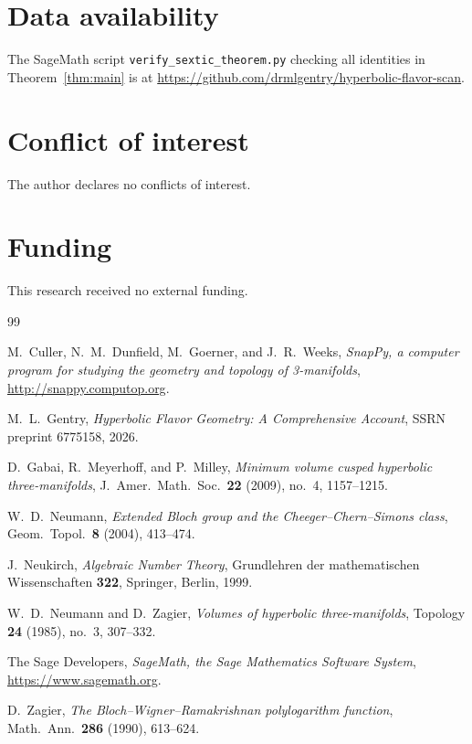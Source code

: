 \documentclass[12pt]{amsart}
\theoremstyle{definition}
\begin{document}
\section*{Data availability}
The SageMath script \texttt{verify\_sextic\_theorem.py} checking all
identities in Theorem~\ref{thm:main} is at
\url{https://github.com/drmlgentry/hyperbolic-flavor-scan}.

\section*{Conflict of interest}
The author declares no conflicts of interest.

\section*{Funding}
This research received no external funding.

\begin{thebibliography}{99}

  M.\ Culler, N.\ M.\ Dunfield, M.\ Goerner, and J.\ R.\ Weeks,
  \emph{SnapPy, a computer program for studying the geometry and
  topology of 3-manifolds}, \url{http://snappy.computop.org}.

  M.\ L.\ Gentry,
  \emph{Hyperbolic Flavor Geometry: A Comprehensive Account},
  SSRN preprint 6775158, 2026.

  D.\ Gabai, R.\ Meyerhoff, and P.\ Milley,
  \emph{Minimum volume cusped hyperbolic three-manifolds},
  J.\ Amer.\ Math.\ Soc.\ \textbf{22} (2009), no.\ 4, 1157--1215.

  W.\ D.\ Neumann,
  \emph{Extended Bloch group and the Cheeger--Chern--Simons class},
  Geom.\ Topol.\ \textbf{8} (2004), 413--474.

  J.\ Neukirch,
  \emph{Algebraic Number Theory},
  Grundlehren der mathematischen Wissenschaften \textbf{322},
  Springer, Berlin, 1999.

  W.\ D.\ Neumann and D.\ Zagier,
  \emph{Volumes of hyperbolic three-manifolds},
  Topology \textbf{24} (1985), no.\ 3, 307--332.

  The Sage Developers,
  \emph{SageMath, the Sage Mathematics Software System},
  \url{https://www.sagemath.org}.

  D.\ Zagier,
  \emph{The Bloch--Wigner--Ramakrishnan polylogarithm function},
  Math.\ Ann.\ \textbf{286} (1990), 613--624.

\end{thebibliography}
\end{document}
